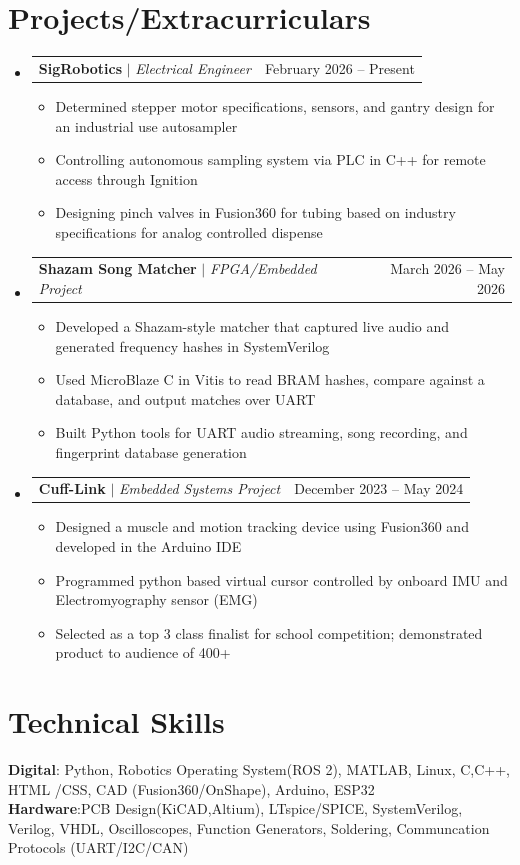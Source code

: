 \documentclass[letterpaper,11pt]{article}
\makeatletter
\newcommand{\resumeItem}[1]{
  \item\small{
    {#1 \vspace{-2pt}}
  }
}
\newcommand{\resumeProjectHeading}[2]{
    \item
    \begin{tabular*}{0.97\textwidth}{l@{\extracolsep{\fill}}r}
      \small#1 & #2 \\
    \end{tabular*}\vspace{-7pt}
}
\newcommand{\resumeSubHeadingListStart}{\begin{itemize}[leftmargin=0.15in, label={}]}
\newcommand{\resumeSubHeadingListEnd}{\end{itemize}}
\newcommand{\resumeItemListStart}{\begin{itemize}}
\newcommand{\resumeItemListEnd}{\end{itemize}\vspace{-5pt}}
\makeatother
\begin{document}
\section{Projects/Extracurriculars}
    \resumeSubHeadingListStart
        \resumeProjectHeading
          {\textbf{SigRobotics} $|$ \emph{Electrical Engineer}}{February 2026 -- Present}
          \resumeItemListStart
            \resumeItem{Determined stepper motor specifications, sensors, and gantry design for an industrial use autosampler}
            \resumeItem{Controlling autonomous sampling system via PLC in C++ for remote access through Ignition}
            \resumeItem{Designing pinch valves in Fusion360 for tubing based on industry specifications for analog controlled dispense}
          \resumeItemListEnd
      \resumeProjectHeading
          {\textbf{Shazam Song Matcher} $|$ \emph{FPGA/Embedded Project}}{March 2026 -- May 2026}
          \resumeItemListStart
            \resumeItem{Developed a Shazam-style matcher that captured live audio and generated frequency hashes in SystemVerilog}
            \resumeItem{Used MicroBlaze C in Vitis to read BRAM hashes, compare against a database, and output matches over UART}
            \resumeItem{Built Python tools for UART audio streaming, song recording, and fingerprint database generation}
          \resumeItemListEnd
        \resumeProjectHeading
          {\textbf{Cuff-Link} $|$ \emph{Embedded Systems Project}}{December 2023 -- May 2024}
          \resumeItemListStart
            \resumeItem{Designed a muscle and motion tracking device using Fusion360 and developed in the Arduino IDE}
            \resumeItem{Programmed python based virtual cursor controlled by onboard IMU and Electromyography sensor (EMG)}
            \resumeItem{Selected as a top 3 class finalist for school competition; demonstrated product to audience of 400+}
          \resumeItemListEnd
    \resumeSubHeadingListEnd



%
\section{Technical Skills}
 \begin{itemize}[leftmargin=0.15in, label={}]
    \small{\item{
     \textbf{Digital}{: Python, Robotics Operating System(ROS 2), MATLAB, Linux, C,C++, HTML  /CSS, CAD (Fusion360/OnShape), Arduino, ESP32} \\
     \textbf{Hardware}{:PCB Design(KiCAD,Altium), LTspice/SPICE, SystemVerilog, Verilog, VHDL, Oscilloscopes, Function Generators, Soldering, Communcation Protocols (UART/I2C/CAN)} \\
    }}
 \end{itemize}


\end{document}
